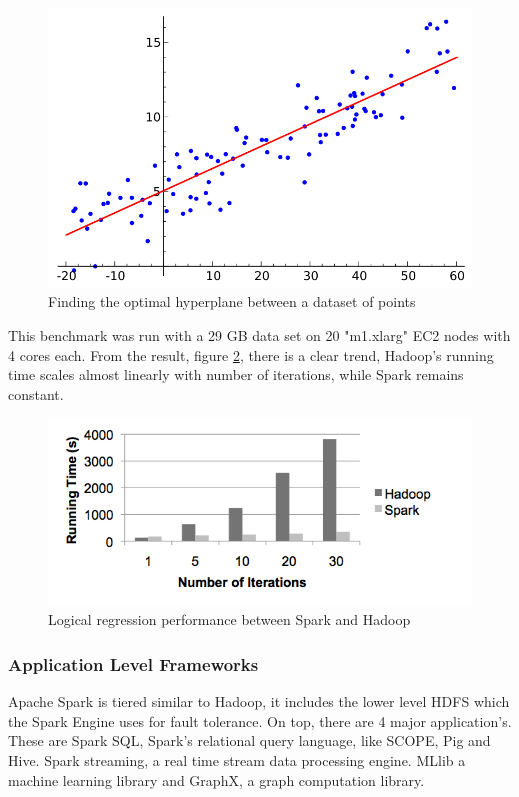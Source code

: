 \documentclass[10pt,twocolumn]{IEEEtran11}
\begin{document}
\begin{figure}[h]
	\centering
	\includegraphics[scale=0.3]{images/logicalRegression.png}
	\caption{Finding the optimal hyperplane between a dataset of points}
	\label{fig:logicalRegression}
\end{figure}

This benchmark was run with a 29 GB data set on 20 "m1.xlarg" EC2 nodes with 4 cores each.  From the result, figure \ref{fig:sparkPerformance},  there is a clear trend, Hadoop's running time scales almost linearly with number of iterations, while Spark remains constant.

\begin{figure}[h]
	\centering
	\includegraphics[width = 10 cm]{images/sparkPerformance.png}
	\caption{Logical regression performance between Spark and Hadoop  \protect\cite{zaharia2010spark}}
	\label{fig:sparkPerformance}
\end{figure}

\subsubsection{Application Level Frameworks}
Apache Spark is tiered similar to Hadoop, it includes the lower level HDFS which the Spark Engine uses for fault tolerance.  On top, there are 4 major application's.  These are Spark SQL, Spark's relational query language, like SCOPE, Pig and Hive.  Spark streaming, a real time stream data processing engine.  MLlib a machine learning library and GraphX, a graph computation library.
\end{document}
